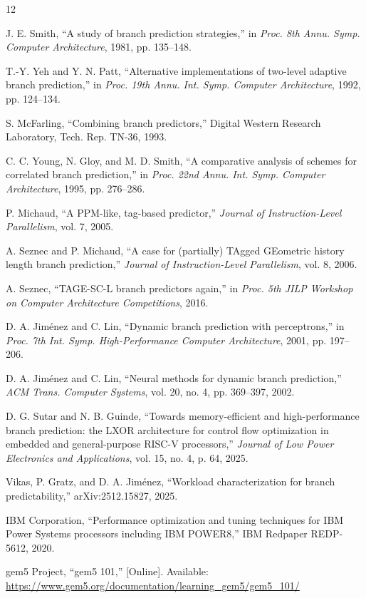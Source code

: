 \documentclass[conference]{IEEEtran}
\begin{document}

\begin{thebibliography}{12}

J. E. Smith, ``A study of branch prediction strategies,'' in \emph{Proc. 8th Annu. Symp. Computer Architecture}, 1981, pp. 135--148.

T.-Y. Yeh and Y. N. Patt, ``Alternative implementations of two-level adaptive branch prediction,'' in \emph{Proc. 19th Annu. Int. Symp. Computer Architecture}, 1992, pp. 124--134.

S. McFarling, ``Combining branch predictors,'' Digital Western Research Laboratory, Tech. Rep. TN-36, 1993.

C. C. Young, N. Gloy, and M. D. Smith, ``A comparative analysis of schemes for correlated branch prediction,'' in \emph{Proc. 22nd Annu. Int. Symp. Computer Architecture}, 1995, pp. 276--286.

P. Michaud, ``A PPM-like, tag-based predictor,'' \emph{Journal of Instruction-Level Parallelism}, vol. 7, 2005.

A. Seznec and P. Michaud, ``A case for (partially) TAgged GEometric history length branch prediction,'' \emph{Journal of Instruction-Level Parallelism}, vol. 8, 2006.

A. Seznec, ``TAGE-SC-L branch predictors again,'' in \emph{Proc. 5th JILP Workshop on Computer Architecture Competitions}, 2016.

D. A. Jim\'enez and C. Lin, ``Dynamic branch prediction with perceptrons,'' in \emph{Proc. 7th Int. Symp. High-Performance Computer Architecture}, 2001, pp. 197--206.

D. A. Jim\'enez and C. Lin, ``Neural methods for dynamic branch prediction,'' \emph{ACM Trans. Computer Systems}, vol. 20, no. 4, pp. 369--397, 2002.

D. G. Sutar and N. B. Guinde, ``Towards memory-efficient and high-performance branch prediction: the LXOR architecture for control flow optimization in embedded and general-purpose RISC-V processors,'' \emph{Journal of Low Power Electronics and Applications}, vol. 15, no. 4, p. 64, 2025.

Vikas, P. Gratz, and D. A. Jim\'enez, ``Workload characterization for branch predictability,'' arXiv:2512.15827, 2025.

IBM Corporation, ``Performance optimization and tuning techniques for IBM Power Systems processors including IBM POWER8,'' IBM Redpaper REDP-5612, 2020.

gem5 Project, ``gem5 101,'' [Online]. Available: \url{https://www.gem5.org/documentation/learning_gem5/gem5_101/}

\end{thebibliography}
\end{document}
